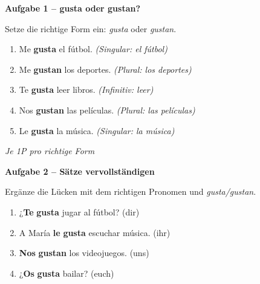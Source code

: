 \documentclass[11pt, a4paper]{article}
\newcommand{\fachfarbe}{spanisch}
\newcommand{\punktebox}[1]{\hfill\fbox{\small \_/#1}}
\newcommand{\loesung}[1]{\textcolor{loesung}{\textbf{#1}}}
\newenvironment{aufgabe}[1]{%
    \vspace{10pt}
    \noindent\textbf{\textcolor{\fachfarbe}{Aufgabe #1}}
    \vspace{5pt}
    \begin{list}{}{\leftmargin=0pt}
    \item[]
}{%
    \end{list}
}
\begin{document}
\vspace{10pt}


\begin{aufgabe}{1 -- gusta oder gustan?}
Setze die richtige Form ein: \textit{gusta} oder \textit{gustan}. \punktebox{5}
\end{aufgabe}

\begin{enumerate}[label=\alph*)]
    \item Me \loesung{gusta} el fútbol. \textit{\textcolor{grau}{(Singular: el fútbol)}}
    \item Me \loesung{gustan} los deportes. \textit{\textcolor{grau}{(Plural: los deportes)}}
    \item Te \loesung{gusta} leer libros. \textit{\textcolor{grau}{(Infinitiv: leer)}}
    \item Nos \loesung{gustan} las películas. \textit{\textcolor{grau}{(Plural: las películas)}}
    \item Le \loesung{gusta} la música. \textit{\textcolor{grau}{(Singular: la música)}}
\end{enumerate}

\textit{\textcolor{grau}{Je 1P pro richtige Form}}

\vspace{15pt}


\begin{aufgabe}{2 -- Sätze vervollständigen}
Ergänze die Lücken mit dem richtigen Pronomen und \textit{gusta/gustan}. \punktebox{4}
\end{aufgabe}

\begin{enumerate}[label=\alph*)]
    \item ¿\loesung{Te} \loesung{gusta} jugar al fútbol? (dir)
    \item A María \loesung{le} \loesung{gusta} escuchar música. (ihr)
    \item \loesung{Nos} \loesung{gustan} los videojuegos. (uns)
    \item ¿\loesung{Os} \loesung{gusta} bailar? (euch)
\end{enumerate}
\end{document}
